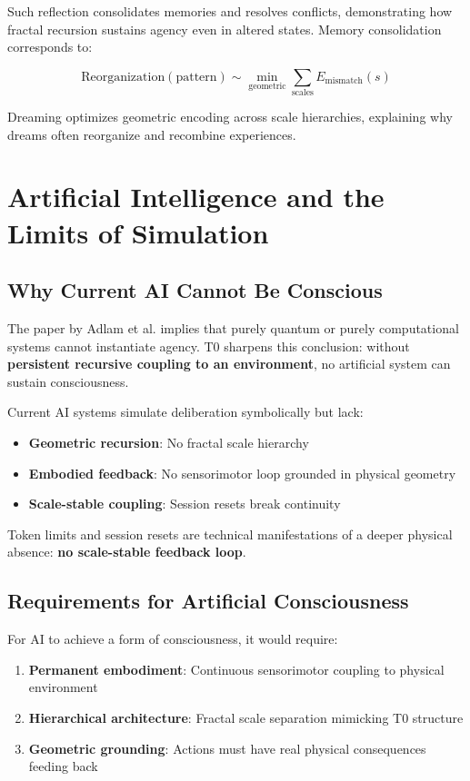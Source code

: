 	Such reflection consolidates memories and resolves conflicts, demonstrating how fractal recursion sustains agency even in altered states. Memory consolidation corresponds to:
	
	\[
	\text{Reorganization}(\text{pattern}) \sim \min_{\text{geometric}} \sum_{\text{scales}} E_{\text{mismatch}}(s)
	\]
	
	Dreaming optimizes geometric encoding across scale hierarchies, explaining why dreams often reorganize and recombine experiences.
	
	\section{Artificial Intelligence and the Limits of Simulation}
	
	\subsection{Why Current AI Cannot Be Conscious}
	
	The paper by Adlam et al. implies that purely quantum or purely computational systems cannot instantiate agency. T0 sharpens this conclusion: without \textbf{persistent recursive coupling to an environment}, no artificial system can sustain consciousness.
	
	Current AI systems simulate deliberation symbolically but lack:
	
	\begin{itemize}
		\item \textbf{Geometric recursion}: No fractal scale hierarchy
		\item \textbf{Embodied feedback}: No sensorimotor loop grounded in physical geometry
		\item \textbf{Scale-stable coupling}: Session resets break continuity
	\end{itemize}
	
	Token limits and session resets are technical manifestations of a deeper physical absence: \textbf{no scale-stable feedback loop}.
	
	\subsection{Requirements for Artificial Consciousness}
	
	For AI to achieve a form of consciousness, it would require:
	
	\begin{enumerate}
		\item \textbf{Permanent embodiment}: Continuous sensorimotor coupling to physical environment
		\item \textbf{Hierarchical architecture}: Fractal scale separation mimicking T0 structure
		\item \textbf{Geometric grounding}: Actions must have real physical consequences feeding back
	\end{enumerate}
	
